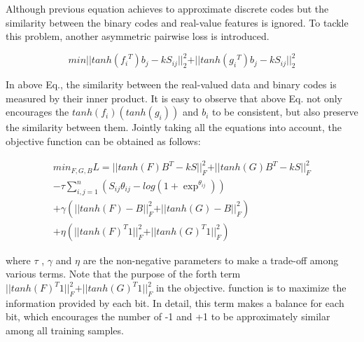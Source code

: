 Although previous equation achieves to approximate discrete codes but the similarity between the binary codes and real-value features is ignored. To tackle this problem, another asymmetric pairwise loss is introduced.

\begin{equation}
	    min \vert \vert tanh({f_{i}}^T)b_{j} - kS_{ij} \vert \vert ^2 _{2} + \vert \vert tanh({g_{i}}^T)b_{j} - kS_{ij} \vert \vert^2_{2}
\label{eq3}
\end{equation}

In above Eq., the similarity between the real-valued data and binary codes is measured by their inner product. It is easy to observe that above Eq. not only encourages the $tanh(f_{i} ) (tanh(g_{i} ))$ and $b_{i}$ to be consistent, but also preserve the similarity between them.
Jointly taking all the equations into account, the objective function can be obtained as follows:


\begin{equation}
	\begin{aligned}
	    min_{F,G,B}  L = \vert \vert tanh(F)B^T - kS \vert \vert ^2 _{F} + \vert \vert tanh(G)B^T - kS \vert \vert^2_{F} 
	    \\- \tau \sum\limits_{i,j=1}^n (S_{ij}\theta_{ij} - log(1 + \exp^{\theta_{ij}})) 
	    \\+ \gamma (\vert \vert tanh(F) - B \vert \vert^2_{F} + \vert \vert tanh(G) - B\vert \vert^2_{F}) 
	    \\+ \eta(\vert \vert tanh(F)^T1\vert\vert^2_{F} + \vert\vert tanh(G)^T1 \vert \vert^2_{F})
	   \end{aligned}
\label{eq4}
\end{equation}


where $\tau$ , $\gamma$ and $\eta$ are the non-negative parameters to make a trade-off among various terms. Note that the purpose of the
forth term $\vert \vert tanh(F)^T1 \vert \vert^2_{F} + \vert \vert tanh(G)^T1 \vert \vert^2_{F}$ in the objective. function is to maximize the information provided by each bit. In detail, this term makes a balance for each bit, which encourages the number of -1 and +1 to be approximately similar among all training samples.
